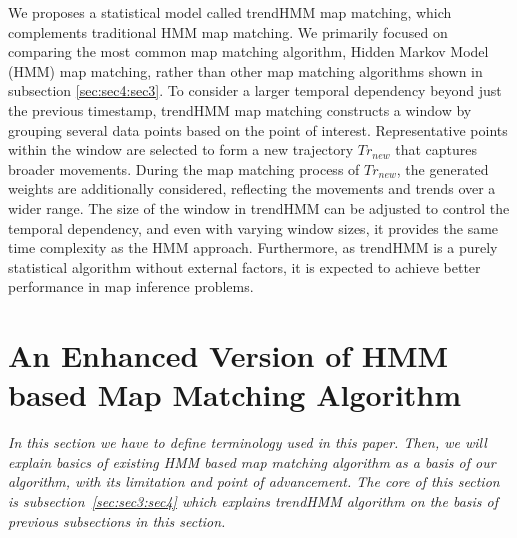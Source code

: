 \documentclass[preprint,12pt]{elsarticle}
\begin{document}
We proposes a statistical model called trendHMM map matching, which complements traditional HMM map matching. 
We primarily focused on comparing the most common map matching algorithm, Hidden Markov Model (HMM) map matching, rather than other map matching algorithms shown in subsection \ref{sec:sec4:sec3}. To consider a larger temporal dependency beyond just the previous timestamp, trendHMM map matching constructs a window by grouping several data points based on the point of interest. Representative points within the window are selected to form a new trajectory $Tr_{new}$ that captures broader movements. During the map matching process of $Tr_{new}$, the generated weights are additionally considered, reflecting the movements and trends over a wider range. The size of the window in trendHMM can be adjusted to control the temporal dependency, and even with varying window sizes, it provides the same time complexity as the HMM approach. Furthermore, as trendHMM is a purely statistical algorithm without external factors, it is expected to achieve better performance in map inference problems.

\section{An Enhanced Version of HMM based Map Matching Algorithm}
\label{sec:sec3}

\emph{
In this section we have to define terminology used in this paper. Then, we will explain basics of existing HMM based map matching algorithm as a basis of our algorithm, with its limitation and point of advancement. The core of this section is subsection~\ref{sec:sec3:sec4} which explains trendHMM algorithm on the basis of previous subsections in this section.
}
\end{document}
